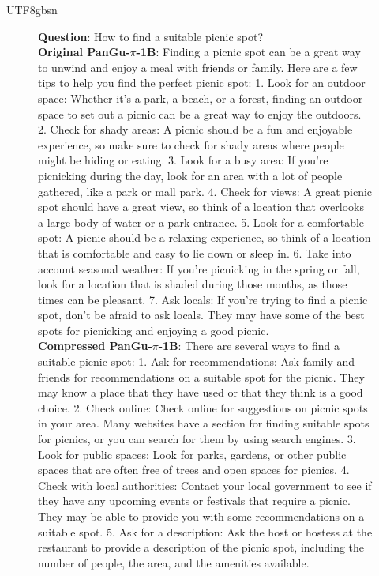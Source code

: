 \documentclass{article}
\theoremstyle{plain}
\theoremstyle{definition}
\theoremstyle{remark}
\begin{document}
\begin{CJK}{UTF8}{gbsn}
\begin{figure}[t]
	\begin{center}
		\begin{tcolorbox}[colback=gray!10,%
			colframe=black,%
			width=16cm,%
			arc=1mm, auto outer arc,
			boxrule=0.8pt,
			]
			\textbf{Question}: How to find a suitable picnic spot?\\
			\textbf{Original PanGu-$\pi$-1B}: Finding a picnic spot can be a great way to unwind and enjoy a meal with friends or family. Here are a few tips to help you find the perfect picnic spot:
1. Look for an outdoor space: Whether it's a park, a beach, or a forest, finding an outdoor space to set out a picnic can be a great way to enjoy the outdoors.
2. Check for shady areas: A picnic should be a fun and enjoyable experience, so make sure to check for shady areas where people might be hiding or eating.
3. Look for a busy area: If you're picnicking during the day, look for an area with a lot of people gathered, like a park or mall park.
4. Check for views: A great picnic spot should have a great view, so think of a location that overlooks a large body of water or a park entrance.
5. Look for a comfortable spot: A picnic should be a relaxing experience, so think of a location that is comfortable and easy to lie down or sleep in.
6. Take into account seasonal weather: If you're picnicking in the spring or fall, look for a location that is shaded during those months, as those times can be pleasant.
7. Ask locals: If you're trying to find a picnic spot, don't be afraid to ask locals. They may have some of the best spots for picnicking and enjoying a good picnic.\\
			\textbf{Compressed PanGu-$\pi$-1B}: There are several ways to find a suitable picnic spot:
1. Ask for recommendations: Ask family and friends for recommendations on a suitable spot for the picnic. They may know a place that they have used or that they think is a good choice.
2. Check online: Check online for suggestions on picnic spots in your area. Many websites have a section for finding suitable spots for picnics, or you can search for them by using search engines.
3. Look for public spaces: Look for parks, gardens, or other public spaces that are often free of trees and open spaces for picnics.
4. Check with local authorities: Contact your local government to see if they have any upcoming events or festivals that require a picnic. They may be able to provide you with some recommendations on a suitable spot.
5. Ask for a description: Ask the host or hostess at the restaurant to provide a description of the picnic spot, including the number of people, the area, and the amenities available.

\end{tcolorbox}
\end{center}
\end{figure}
\end{CJK}
\end{document}
